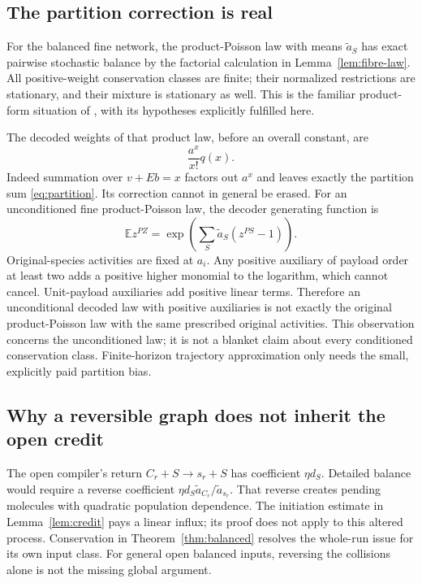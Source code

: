 \documentclass[11pt,reqno]{amsart}
\theoremstyle{definition}
\theoremstyle{remark}
\newcommand{\E}{\mathbb E}
\begin{document}
\subsection{The partition correction is real}
For the balanced fine network, the product-Poisson law with means
$\widetilde a_S$ has exact pairwise stochastic balance by the factorial
calculation in Lemma~\ref{lem:fibre-law}. All positive-weight conservation
classes are finite; their normalized restrictions are stationary, and their
mixture is stationary as well. This is the familiar product-form situation
of \cite{ACK2010}, with its hypotheses explicitly fulfilled here.

The decoded weights of that product law, before an overall constant, are
\begin{equation}\label{eq:pushforward-q}
 \frac{a^x}{x!}q(x).
\end{equation}
Indeed summation over $v+Eb=x$ factors out $a^x$ and leaves exactly the
partition sum \eqref{eq:partition}. Its correction cannot in general be
erased. For an unconditioned fine product-Poisson law, the decoder generating
function is
\begin{equation}\label{eq:compound-poisson}
 \E z^{PZ}=\exp\left(\sum_S\widetilde a_S(z^{PS}-1)\right).
\end{equation}
Original-species activities are fixed at $a_i$. Any positive auxiliary of
payload order at least two adds a positive higher monomial to the logarithm,
which cannot cancel. Unit-payload auxiliaries add positive linear terms.
Therefore an unconditional decoded law with positive auxiliaries is not
exactly the original product-Poisson law with the same prescribed original
activities. This observation concerns the unconditioned law; it is not a
blanket claim about every conditioned conservation class. Finite-horizon
trajectory approximation only needs the small, explicitly paid partition
bias.

\subsection{Why a reversible graph does not inherit the open credit}
The open compiler's return $C_r+S\to s_r+S$ has coefficient $\eta d_S$.
Detailed balance would require a reverse coefficient
$\eta d_S\widetilde a_{C_r}/\widetilde a_{s_r}$.
That reverse creates pending molecules with quadratic population dependence.
The initiation estimate in Lemma~\ref{lem:credit} pays a linear influx; its
proof does not apply to this altered process. Conservation in
Theorem~\ref{thm:balanced} resolves the whole-run issue for its own input
class. For general open balanced inputs, reversing the collisions alone is
not the missing global argument.
\end{document}
